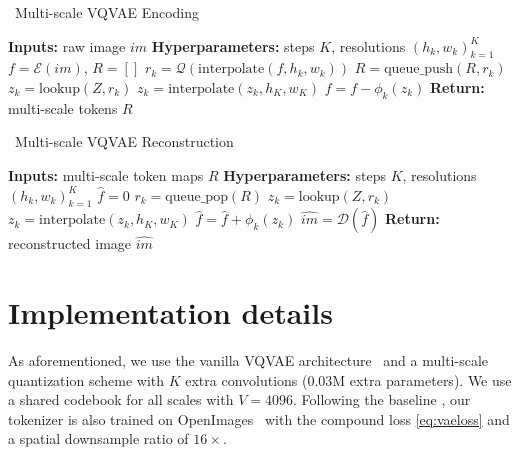 \begin{center}
\begin{minipage}[t]{0.5\linewidth}
  \centering
  \scalebox{0.86}
  {
  \begin{algorithm}[H]
    \caption{\small{~Multi-scale VQVAE Encoding}} \label{alg:enc}
    \small{
    \textbf{Inputs: } raw image $im$\;
    \textbf{Hyperparameters: } steps $K$, resolutions $(h_k,w_k)_{k=1}^{K}$\;
    $f = \mathcal{E}(im)$, $R=[]$\;
    {
    $r_k = \mathcal{Q}(\text{interpolate}(f, h_k, w_k))$\;
    $R = \text{queue\_push}(R, r_k)$\;
    $z_k = \text{lookup}(Z, r_k)$\;
    $z_k = \text{interpolate}(z_k, h_K, w_K)$\;
    $f = f - \phi_k(z_k)$\;
    }
    \textbf{Return: } multi-scale tokens $R$\;
    }
  \end{algorithm}
  }
\end{minipage}%
\begin{minipage}[t]{0.5\linewidth}
  \centering
  \scalebox{0.81}
  {
  \begin{algorithm}[H]
    \caption{\small{~Multi-scale VQVAE Reconstruction}} \label{alg:dec}
    \small{
    \textbf{Inputs: } multi-scale token maps $R$\;
    \textbf{Hyperparameters: } steps $K$, resolutions $(h_k,w_k)_{k=1}^{K}$\;
    $\hat{f} = 0 $\;
    {
    $r_k = \text{queue\_pop}(R)$\;
    $z_k = \text{lookup}(Z, r_k)$\;
    $z_k = \text{interpolate}(z_k, h_K, w_K)$\;
    $\hat{f} = \hat{f} + \phi_k(z_k)$\;
    }
    $\hat{im} = \mathcal{D}(\hat{f}) $\;
    \textbf{Return: } reconstructed image $\hat{im}$\;
    }
  \end{algorithm}
  }
\end{minipage}
\end{center}

\section{Implementation details} \label{sec:impl}
As aforementioned, we use the vanilla VQVAE architecture~\cite{vqgan} and a multi-scale quantization scheme with $K$ extra convolutions (0.03M extra parameters).
We use a shared codebook for all scales with $V=4096$.
Following the baseline \cite{vqgan}, our tokenizer is also trained on OpenImages~\cite{openimages} with the compound loss \eqref{eq:vaeloss} and a spatial downsample ratio of $16\times$.

